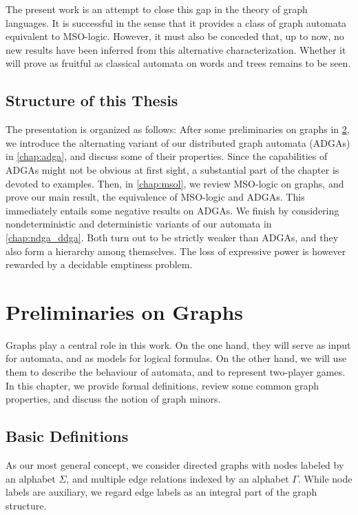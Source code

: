 \documentclass[a4paper,11pt,twoside]{report} \pdfoutput=1
\begin{document}
The present work is an attempt to close this gap in the theory of
graph languages. It is successful in the sense that it provides a
class of graph automata equivalent to MSO-logic. However, it must also
be conceded that, up to now, no new results have been inferred from
this alternative characterization. Whether it will prove as fruitful
as classical automata on words and trees remains to be seen.

\section{Structure of this Thesis}
The presentation is organized as follows: After some preliminaries on
graphs in \cref{chap:graphs}, we introduce the alternating variant of
our distributed graph automata (ADGAs) in \cref{chap:adga}, and
discuss some of their properties. Since the capabilities of ADGAs
might not be obvious at first sight, a substantial part of the chapter
is devoted to examples. Then, in \cref{chap:msol}, we review MSO-logic
on graphs, and prove our main result, the equivalence of MSO-logic and
ADGAs. This immediately entails some negative results on ADGAs. We
finish by considering nondeterministic and deterministic variants of
our automata in \cref{chap:ndga_ddga}. Both turn out to be strictly
weaker than ADGAs, and they also form a hierarchy among themselves.
The loss of expressive power is however rewarded by a decidable
emptiness problem.
 

\chapter{Preliminaries on Graphs} \label{chap:graphs}
Graphs play a central role in this work. On the one hand, they will
serve as input for automata, and as models for logical formulas. On
the other hand, we will use them to describe the behaviour of
automata, and to represent two-player games. In this chapter, we
provide formal definitions, review some common graph properties, and
discuss the notion of graph minors.

\section{Basic Definitions}
As our most general concept, we consider directed graphs with nodes
labeled by an alphabet $Σ$, and multiple edge relations indexed by an
alphabet $Γ$. While node labels are auxiliary, we regard edge labels
as an integral part of the graph structure.
\end{document}
